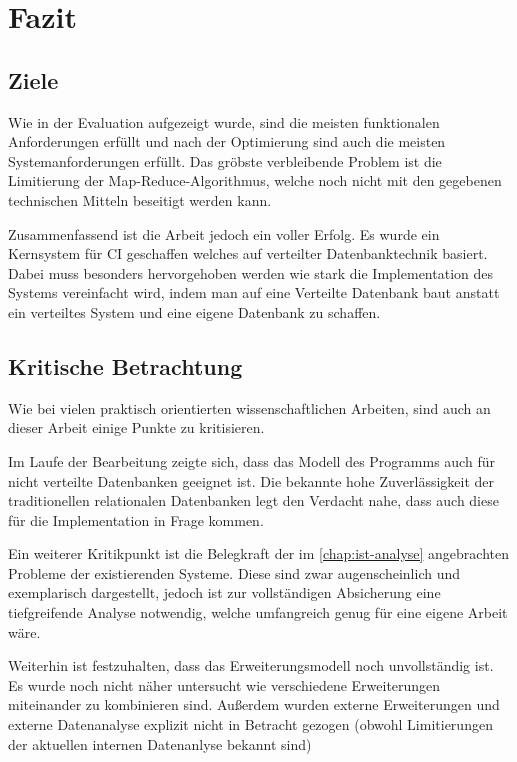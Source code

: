 \chapter{Fazit}
\label{cha:fazit}


\section{Ziele}
\label{sec:fazit:ziele}

Wie in der Evaluation aufgezeigt wurde, sind die meisten funktionalen Anforderungen erfüllt und nach der Optimierung sind auch die meisten Systemanforderungen erfüllt.
Das gröbste verbleibende Problem ist die Limitierung der Map-Reduce-Algorithmus,
welche noch nicht mit den gegebenen technischen Mitteln beseitigt werden kann.

Zusammenfassend ist die Arbeit jedoch ein voller Erfolg.
Es wurde ein Kernsystem für \ac{CI} geschaffen welches auf verteilter Datenbanktechnik basiert.
Dabei muss besonders hervorgehoben werden wie stark die Implementation des Systems vereinfacht wird, indem man auf eine Verteilte Datenbank baut anstatt ein verteiltes System und eine eigene Datenbank zu schaffen.


\section{Kritische Betrachtung}
\label{sec:fazit:kritik}

Wie bei vielen praktisch orientierten wissenschaftlichen Arbeiten,
sind auch an dieser Arbeit einige Punkte zu kritisieren.

Im Laufe der Bearbeitung zeigte sich, dass das Modell des Programms auch für
nicht verteilte Datenbanken geeignet ist.
Die bekannte hohe Zuverlässigkeit der traditionellen relationalen Datenbanken legt den Verdacht nahe, dass auch diese für die Implementation in Frage kommen.

Ein weiterer Kritikpunkt ist die Belegkraft der im \cref{chap:ist-analyse} angebrachten Probleme der existierenden Systeme. Diese sind zwar augenscheinlich und exemplarisch dargestellt, jedoch ist zur vollständigen Absicherung eine tiefgreifende Analyse notwendig, welche umfangreich genug für eine eigene Arbeit wäre.

Weiterhin ist festzuhalten, dass das Erweiterungsmodell noch unvollständig ist.
Es wurde noch nicht näher untersucht wie verschiedene Erweiterungen miteinander zu kombinieren sind. Außerdem wurden externe Erweiterungen und externe Datenanalyse explizit nicht in Betracht gezogen (obwohl Limitierungen der aktuellen internen Datenanlyse bekannt sind)

